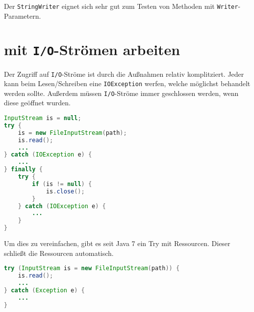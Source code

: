 Der \lstinline{StringWriter} eignet sich sehr gut zum Testen von Methoden mit \lstinline{Writer}-Parametern.

\section{mit \texttt{I/O}-Strömen arbeiten}

Der Zugriff auf \texttt{I/O}-Ströme ist durch die Außnahmen relativ komplitziert. Jeder kann beim Lesen/Schreiben eine \lstinline{IOException} werfen, welche möglichst behandelt werden sollte. Außerdem müssen \texttt{I/O}-Ströme immer geschlossen werden, wenn diese geöffnet wurden.

\begin{lstlisting}[language=Java, caption={Kompletter beispielzugriff auf InputStream}]
InputStream is = null;
try {
    is = new FileInputStream(path);
    is.read();
    ...
} catch (IOException e) {
    ...
} finally {
    try {
        if (is != null) {
            is.close();
        }
    } catch (IOException e) {
        ...
    }
}
\end{lstlisting}

Um dies zu vereinfachen, gibt es seit Java 7 ein Try mit Ressourcen. Dieser schließt die Ressourcen automatisch.

\begin{lstlisting}[language=Java, caption={Kompletter beispielzugriff auf InputStream}]
try (InputStream is = new FileInputStream(path)) {
    is.read();
    ...
} catch (Exception e) {
    ...
}
\end{lstlisting}